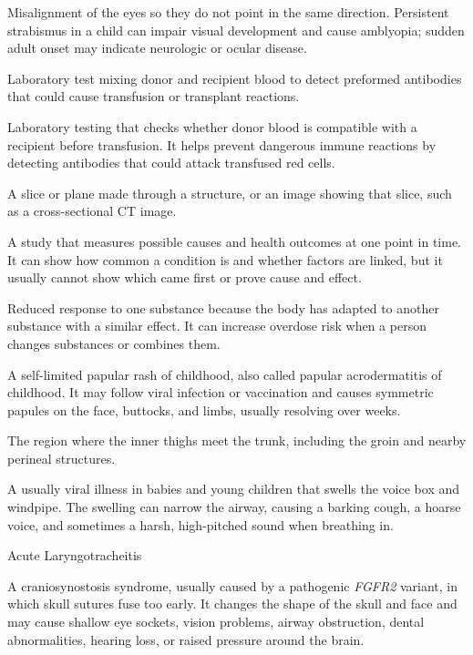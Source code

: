  Misalignment of the eyes so they do not point in the same direction. Persistent strabismus in a child can impair visual development and cause amblyopia; sudden adult onset may indicate neurologic or ocular disease.

 Laboratory test mixing donor and recipient blood to detect preformed antibodies that could cause transfusion or transplant reactions.

 Laboratory testing that checks whether donor blood is compatible with a recipient before transfusion. It helps prevent dangerous immune reactions by detecting antibodies that could attack transfused red cells.

 A slice or plane made through a structure, or an image showing that slice, such as a cross-sectional CT image.

 A study that measures possible causes and health outcomes at one point in time. It can show how common a condition is and whether factors are linked, but it usually cannot show which came first or prove cause and effect.

 Reduced response to one substance because the body has adapted to another substance with a similar effect. It can increase overdose risk when a person changes substances or combines them.

 A self-limited papular rash of childhood, also called papular acrodermatitis of childhood. It may follow viral infection or vaccination and causes symmetric papules on the face, buttocks, and limbs, usually resolving over weeks.

 The region where the inner thighs meet the trunk, including the groin and nearby perineal structures.

 A usually viral illness in babies and young children that swells the voice box and windpipe. The swelling can narrow the airway, causing a barking cough, a hoarse voice, and sometimes a harsh, high-pitched sound when breathing in.

\synonyms
Acute Laryngotracheitis

 A craniosynostosis syndrome, usually caused by a pathogenic \textit{FGFR2} variant, in which skull sutures fuse too early. It changes the shape of the skull and face and may cause shallow eye sockets, vision problems, airway obstruction, dental abnormalities, hearing loss, or raised pressure around the brain.

